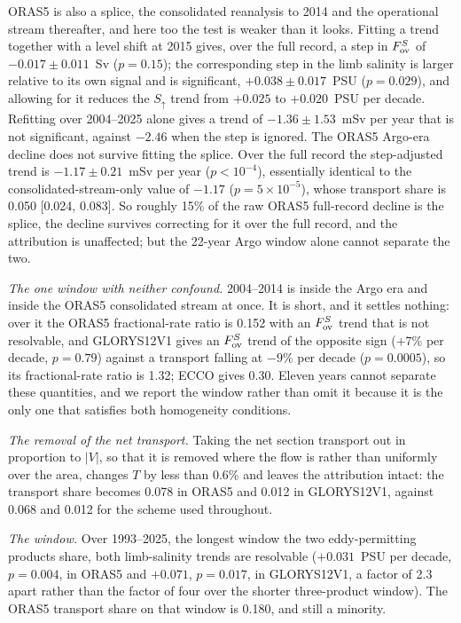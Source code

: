 ORAS5 is also a splice, the consolidated
reanalysis to 2014 and the operational stream thereafter, and here too the test
is weaker than it looks. Fitting a trend together with a level shift at 2015 gives, over
the full record, a step in $F_{\mathrm{ov}}^{S}$ of $-0.017\pm0.011$~Sv ($p=0.15$); the
corresponding step in the limb salinity is larger relative to its own signal and
is significant, $+0.038\pm0.017$~PSU ($p=0.029$), and allowing for it reduces
the $S_{\uparrow}$ trend from $+0.025$ to $+0.020$~PSU per decade. Refitting over
2004--2025 alone gives a trend of $-1.36\pm1.53$~mSv per year that is not
significant, against $-2.46$ when the step is ignored. The ORAS5 Argo-era decline does not survive fitting the splice. Over the full record the step-adjusted trend is
$-1.17\pm0.21$~mSv per year ($p<10^{-4}$), essentially identical to the
consolidated-stream-only value of $-1.17$ ($p=5\times10^{-5}$), whose transport
share is 0.050 [0.024, 0.083]. So roughly 15\% of the raw ORAS5 full-record decline is
the splice, the decline survives correcting for it over the full record, and the
attribution is unaffected; but the 22-year Argo window alone cannot separate the
two.

\emph{The one window with neither confound.} 2004--2014 is inside the Argo era
and inside the ORAS5 consolidated stream at once. It is short, and it settles
nothing: over it the ORAS5 fractional-rate ratio is 0.152 with an $F_{\mathrm{ov}}^{S}$ trend that
is not resolvable, and GLORYS12V1 gives an $F_{\mathrm{ov}}^{S}$ trend of the opposite sign
($+7$\% per decade, $p=0.79$) against a transport falling at $-9$\% per decade
($p=0.0005$), so its fractional-rate ratio is 1.32; ECCO gives 0.30. Eleven years cannot
separate these quantities, and we report the window rather than omit it because
it is the only one that satisfies both homogeneity conditions.

\emph{The removal of the net transport.} Taking the net section transport out in
proportion to $|V|$, so that it is removed where the flow is rather than
uniformly over the area, changes $T$ by less than 0.6\% and leaves the
attribution intact: the transport share becomes 0.078 in ORAS5 and 0.012 in
GLORYS12V1, against 0.068 and 0.012 for the scheme used throughout.

\emph{The window.} Over 1993--2025, the longest window the two eddy-permitting
products share, both limb-salinity trends are resolvable ($+0.031$~PSU per
decade, $p=0.004$, in ORAS5 and $+0.071$, $p=0.017$, in GLORYS12V1, a factor of
2.3 apart rather than the factor of four over the shorter three-product window).
The ORAS5 transport share on that window is 0.180, and still a minority.

